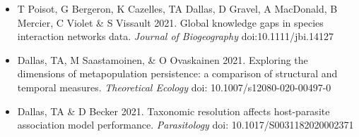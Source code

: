 \documentclass[]{CV}
\begin{document}
\begin{itemize}
\item T Poisot, G Bergeron, K Cazelles, {\mefont TA Dallas}, D Gravel, A MacDonald, B Mercier, C Violet \& S Vissault 2021. Global knowledge gaps in species interaction networks data. \textit{Journal of Biogeography} doi:10.1111/jbi.14127

\item {\mefont Dallas, TA}, M Saastamoinen, \& O Ovaskainen 2021. Exploring the dimensions of metapopulation persistence: a comparison of structural and temporal measures. \textit{Theoretical Ecology} doi: 10.1007/s12080-020-00497-0 

\item {\mefont Dallas, TA} \& D Becker 2021. Taxonomic resolution affects host-parasite association model performance. \textit{Parasitology} doi: 10.1017/S0031182020002371
\end{itemize}




{}
\end{document}
